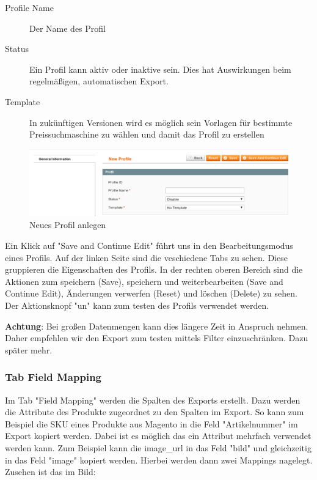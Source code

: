 \documentclass[a4paper,12pt]{book}
\begin{document}
\begin{description}
\item[Profile Name] Der Name des Profil
\item[Status] Ein Profil kann aktiv oder inaktive sein. Dies hat
Auswirkungen beim regelmäßigen, automatischen Export.
\item[Template] In zukünftigen Versionen wird es möglich sein Vorlagen
für bestimmte Preissuchmaschine zu wählen und damit das Profil zu
erstellen
\end{description}

\begin{figure}
 \includegraphics[width=1\textwidth]{img/bild03.png}
  \caption{Neues Profil anlegen}
  \label{figure:new_profile}
\end{figure}

Ein Klick auf "Save and Continue Edit" führt uns in den
Bearbeitungsmodus eines Profils. Auf der linken Seite sind die
veschiedene Tabs zu sehen. Diese gruppieren die Eigenschaften des
Profils. In der rechten oberen Bereich sind die Aktionen zum
speichern (Save), speichern und weiterbearbeiten (Save and Continue
Edit), Änderungen verwerfen (Reset) und löschen (Delete) zu sehen.
Der Aktionsknopf "un" kann zum testen des Profils verwendet werden.

\textbf{Achtung}: Bei großen Datenmengen kann dies längere Zeit in Anspruch
nehmen. Daher empfehlen wir den Export zum testen mittels Filter
einzuschränken. Dazu später mehr.

\subsubsection{Tab Field Mapping}
Im Tab "Field Mapping" werden die Spalten des Exports erstellt. Dazu
werden die Attribute des Produkte zugeordnet zu den Spalten im Export.
So kann zum Beispiel die SKU eines Produkte aus Magento in die Feld
"Artikelnummer" im Export kopiert werden. Dabei ist es möglich das ein
Attribut mehrfach verwendet werden kann. Zum Beispiel kann die
image\_url in das Feld "bild" und gleichzeitig in das Feld
"image" kopiert werden. Hierbei werden dann zwei Mappings
nagelegt. Zusehen ist das im Bild:
\end{document}
